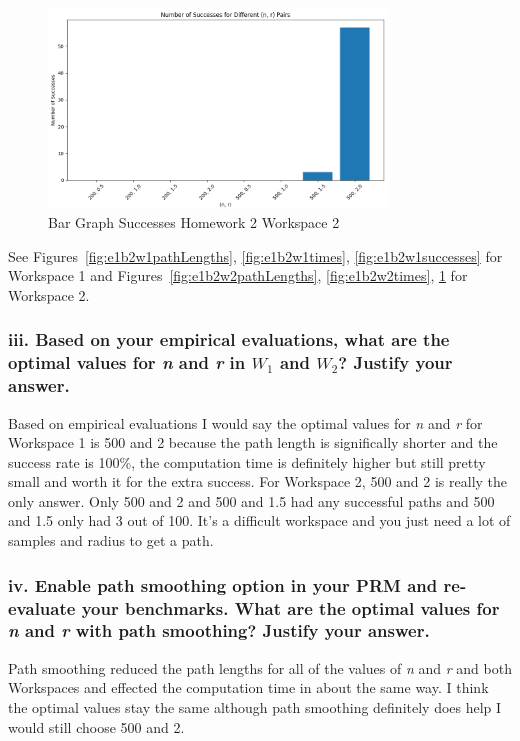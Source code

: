 \documentclass{article}
\begin{document}
\begin{figure}[h]
    \centering
    \includegraphics[width=0.8\textwidth]{e1b2w2successes.png}
    \caption{Bar Graph Successes Homework 2 Workspace 2}
    \label{fig:e1b2w2successes}
\end{figure}

See Figures~\ref{fig:e1b2w1pathLengths}, \ref{fig:e1b2w1times}, \ref{fig:e1b2w1successes} for Workspace 1 and Figures~\ref{fig:e1b2w2pathLengths}, \ref{fig:e1b2w2times}, \ref{fig:e1b2w2successes} for Workspace 2.

\subsubsection*{iii. Based on your empirical evaluations, what are the optimal values for \textit{n} and \textit{r} in $\mathit{W}_1$ and $\mathit{W}_2$? Justify your answer.}

Based on empirical evaluations I would say the optimal values for \textit{n} and \textit{r} for Workspace 1 is 500 and 2 because the path length is significally shorter and the success rate is 100\%, the computation time is definitely higher but still pretty small and worth it for the extra success.
For Workspace 2, 500 and 2 is really the only answer. Only 500 and 2 and 500 and 1.5 had any successful paths and 500 and 1.5 only had 3 out of 100. It's a difficult workspace and you just need a lot of samples and radius to get a path.

\subsubsection*{iv. Enable path smoothing option in your PRM and re-evaluate your benchmarks. What are the optimal values for \textit{n} and \textit{r} with path smoothing? Justify your answer.}

Path smoothing reduced the path lengths for all of the values of \textit{n} and \textit{r} and both Workspaces and effected the computation time in about the same way.
I think the optimal values stay the same although path smoothing definitely does help I would still choose 500 and 2.
\end{document}
